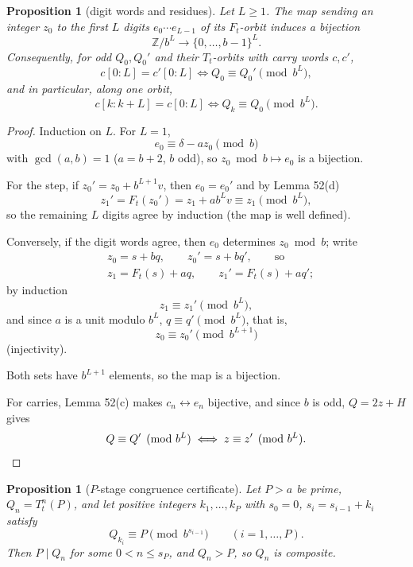 \documentclass[11pt,reqno]{amsart}
\newtheorem{proposition}[theorem]{Proposition}
\theoremstyle{definition}
\theoremstyle{remark}
\begin{document}
\begin{samepage}
\begin{proposition}[digit words and residues]\leavevmode\label{thm:53}
Let \(L\ge1\). The map
sending an integer \(z_0\) to the first \(L\) digits
\(e_0\cdots e_{L-1}\) of its \(F_t\)-orbit induces a bijection
\[
\mathbb Z/b^L\to\{0,\ldots,b-1\}^L.
\]
Consequently, for odd
\(Q_0,Q_0'\) and their \(T_t\)-orbits with carry words \(c,c'\),
\[
c[0:L]=c'[0:L]\iff Q_0\equiv Q_0'\pmod{b^L},
\]
and in particular, along one orbit,
\[
c[k:k+L]=c[0:L]\iff Q_k\equiv Q_0\pmod{b^L}.
\]
\label{thm-end:53}
\end{proposition}
\end{samepage}

\begin{proof}\leavevmode\label{proof:53}
Induction on \(L\). For \(L=1\),
\[
e_0\equiv\delta-az_0\pmod b
\]
with \(\gcd(a,b)=1\) (\(a=b+2\), \(b\)
odd), so \(z_0\bmod b\mapsto e_0\) is a bijection.

For the step, if
\(z_0'=z_0+b^{L+1}v\), then \(e_0=e_0'\) and by Lemma 52(d)
\[
z_1'=F_t(z_0')=z_1+ab^Lv\equiv z_1\pmod{b^L},
\]
so the remaining
\(L\) digits agree by induction (the map is well defined).

Conversely,
if the digit words agree, then \(e_0\) determines \(z_0\bmod b\); write
\[
\begin{aligned}
&z_0=s+bq,\qquad z_0'=s+bq',\qquad\text{so}\\
&z_1=F_t(s)+aq,\qquad z_1'=F_t(s)+aq';
\end{aligned}
\]
by induction
\[
z_1\equiv z_1'\pmod{b^L},
\]
and since \(a\) is a unit
modulo \(b^L\), \(q\equiv q'\pmod{b^L}\), that is,
\[
z_0\equiv z_0'\pmod{b^{L+1}}
\]
(injectivity).

Both sets have
\(b^{L+1}\) elements, so the map is a bijection.

For carries, Lemma
52(c) makes \(c_n\leftrightarrow e_n\) bijective, and since \(b\) is
odd, \(Q=2z+H\) gives
\[
Q\equiv Q'\pmod{b^L}\iff z\equiv z'\pmod{b^L}.\qedhere
\]
\end{proof}

\begin{samepage}
\begin{proposition}[\(P\)-stage congruence certificate]\leavevmode\label{thm:54}
Let \(P>a\)
be prime, \(Q_n=T_t^n(P)\), and let positive integers
\(k_1,\ldots,k_P\) with \(s_0=0\), \(s_i=s_{i-1}+k_i\) satisfy
\[
Q_{k_i}\equiv P\pmod{b^{s_{i-1}}}\qquad(i=1,\ldots,P).
\tag{33}\label{eq:33}
\]
Then \(P\mid Q_n\) for some \(0<n\le s_P\), and \(Q_n>P\), so \(Q_n\) is
composite.
\label{thm-end:54}
\end{proposition}
\end{samepage}
\end{document}
